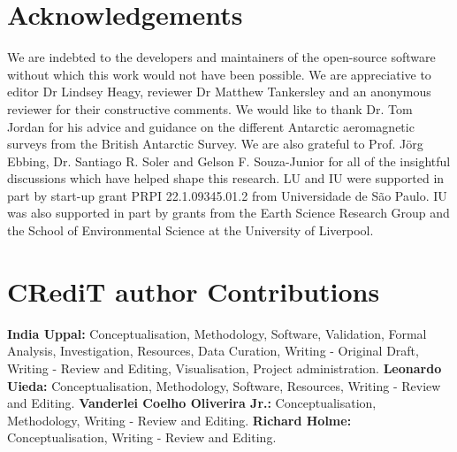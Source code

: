 \section{Acknowledgements}

We are indebted to the developers and maintainers of the open-source software without which this work would not have been possible. We are
appreciative to editor Dr Lindsey Heagy, reviewer Dr Matthew Tankersley and an anonymous reviewer for their constructive comments. We would like to thank Dr. Tom Jordan for his advice and guidance on the different Antarctic aeromagnetic surveys from the British Antarctic Survey. We are also grateful to Prof. J\"{o}rg Ebbing, Dr. Santiago R. Soler and Gelson F. Souza-Junior for all of the insightful discussions which have helped shape this research. LU and IU were supported in part by start-up grant PRPI 22.1.09345.01.2 from Universidade de São Paulo. IU was also supported in part by grants from the Earth Science Research Group and the School of Environmental Science at the University of Liverpool.

\section{CRediT author Contributions}

\textbf{India Uppal:} Conceptualisation, Methodology, Software, Validation, Formal Analysis, Investigation, Resources, Data Curation, Writing - Original Draft, Writing - Review and Editing, Visualisation, Project administration.
\textbf{Leonardo Uieda:} Conceptualisation, Methodology, Software, Resources, Writing - Review and Editing.
\textbf{Vanderlei Coelho Oliverira Jr.:} Conceptualisation, Methodology, Writing - Review and Editing.
\textbf{Richard Holme:} Conceptualisation, Writing - Review and Editing.
